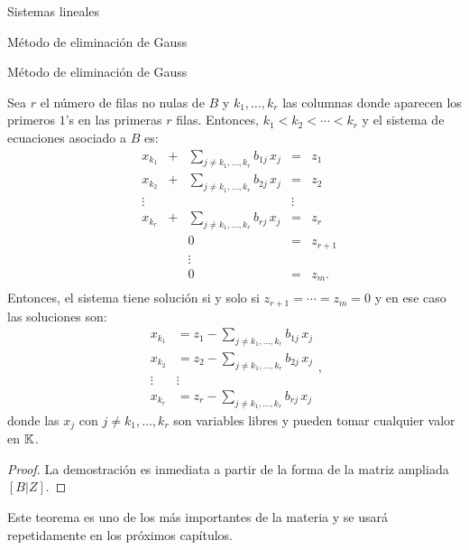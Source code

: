 \begin{chapter}{Sistemas lineales}
\begin{section}{Método de eliminación de Gauss }
\begin{subsection}{Método de eliminación de Gauss}
\begin{teorema}
        Sea $r$ el número de filas no nulas de $B$ y $k_1,\ldots, k_r$ las columnas donde aparecen los primeros $1$'s en las primeras $r$ filas. Entonces, $k_1 < k_2 < \cdots< k_r$ y el sistema de ecuaciones asociado a $B$ es:
        \begin{equation}
            \begin{matrix}
                &x_{k_1}& + &\sum_{j \not= k_1,\ldots, k_r} b_{1j}\,x_j&= &z_1\\
                &x_{k_2}& + &\sum_{j \not= k_1,\ldots, k_r} b_{2j}\,x_j&= &z_2\\
                & \vdots& &  &\vdots \\
                &x_{k_r}& + &\sum_{j \not= k_1,\ldots, k_r} b_{rj}\,x_j&= &z_r\\
                &&  &0&= &z_{r+1}\\
                &&  &\vdots &\\
                &&  &0&= &z_{m}.\\
            \end{matrix}
        \end{equation}  
        Entonces, el sistema tiene solución si y solo si  $z_{r+1} = \cdots = z_m =0$ y en ese caso las soluciones son: 
        \begin{equation}
            \begin{matrix}\label{sist-eq-hom-merf0}
                x_{k_1} &= z_1-\sum_{j \not= k_1,\ldots, k_r} b_{1j}\,x_j\\
                x_{k_2} &= z_2-\sum_{j \not= k_1,\ldots, k_r} b_{2j}\,x_j\\
                \vdots& \vdots \\
                x_{k_r}  &= z_r-\textstyle\sum_{j \not= k_1,\ldots, k_r} b_{rj}\,x_j
            \end{matrix},
        \end{equation}
        donde las $x_j$ con $j \not= k_1,\ldots, k_r$ son variables libres y pueden tomar cualquier valor en $\mathbb K$.
    \end{teorema}
    \begin{proof}
        La demostración es inmediata a partir de la forma de la matriz ampliada $[B|Z]$.
    \end{proof}

    Este teorema es uno de los más importantes de la materia y  se usará repetidamente en los próximos capítulos.



\end{subsection}
\end{section}
\end{chapter}
